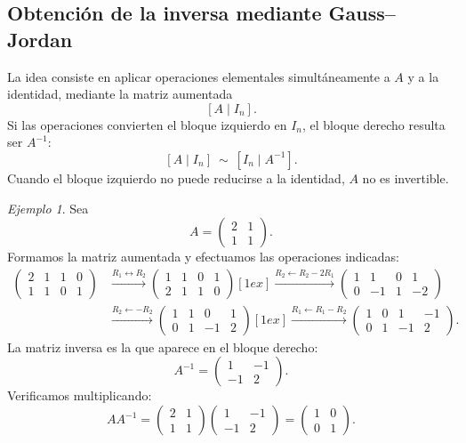 \documentclass[12pt]{article}
\theoremstyle{remark}
\newtheorem{ejemplo}[definicion]{Ejemplo}
\begin{document}
\subsection*{Obtención de la inversa mediante Gauss--Jordan}
La idea consiste en aplicar operaciones elementales simultáneamente a $A$ y a la identidad, mediante la matriz aumentada
\[
\left[A\mid I_n\right].
\]
Si las operaciones convierten el bloque izquierdo en $I_n$, el bloque derecho resulta ser $A^{-1}$:
\[
\boxed{[A\mid I_n]\ \sim\ [I_n\mid A^{-1}].}
\]
Cuando el bloque izquierdo no puede reducirse a la identidad, $A$ no es invertible.

\begin{ejemplo}
Sea
\[
A=\begin{pmatrix}2&1\\1&1\end{pmatrix}.
\]
Formamos la matriz aumentada y efectuamos las operaciones indicadas:
\begin{align*}
\left(\begin{array}{cc|cc}2&1&1&0\\1&1&0&1\end{array}\right)
&\xrightarrow{R_1\leftrightarrow R_2}
\left(\begin{array}{cc|cc}1&1&0&1\\2&1&1&0\end{array}\right)[1ex]
\xrightarrow{R_2\leftarrow R_2-2R_1}
\left(\begin{array}{cc|cc}1&1&0&1\\0&-1&1&-2\end{array}\right)\\[1ex]
&\xrightarrow{R_2\leftarrow -R_2}
\left(\begin{array}{cc|cc}1&1&0&1\\0&1&-1&2\end{array}\right)[1ex]
\xrightarrow{R_1\leftarrow R_1-R_2}
\left(\begin{array}{cc|cc}1&0&1&-1\\0&1&-1&2\end{array}\right).
\end{align*}
La matriz inversa es la que aparece en el bloque derecho:
\[
\boxed{A^{-1}=\begin{pmatrix}1&-1\\-1&2\end{pmatrix}.}
\]
Verificamos multiplicando:
\[
AA^{-1}=\begin{pmatrix}2&1\\1&1\end{pmatrix}
\begin{pmatrix}1&-1\\-1&2\end{pmatrix}
=\begin{pmatrix}1&0\\0&1\end{pmatrix}.
\]
\end{ejemplo}
\end{document}
